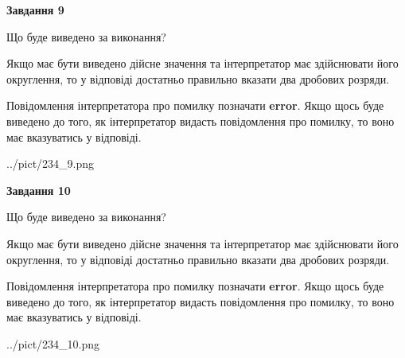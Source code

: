 \documentclass[12pt, ukrainian]{article}
\begin{document}
{\begin {Large}
{\begin {center}\textbf{Завдання 9}\end {center}}\par
Що буде виведено за виконання? \par

Якщо має бути виведено дійсне значення та інтерпретатор має здійснювати його округлення, 
то у відповіді достатньо правильно вказати два дробових розряди.

Повідомлення інтерпретатора про помилку позначати \textbf{error}.
Якщо щось буде виведено до того, як інтерпретатор видасть повідомлення про помилку, 
то воно має вказуватись у відповіді. \par

\begin{center}
	{../pict/234_9.png}
\end{center}
\newpage

{\begin {center}\textbf{Завдання 10}\end {center}}\par
Що буде виведено за виконання? \par

Якщо має бути виведено дійсне значення та інтерпретатор має здійснювати його округлення, 
то у відповіді достатньо правильно вказати два дробових розряди.

Повідомлення інтерпретатора про помилку позначати \textbf{error}.
Якщо щось буде виведено до того, як інтерпретатор видасть повідомлення про помилку, 
то воно має вказуватись у відповіді. \par

\begin{center}
	{../pict/234_10.png}
\end{center}
\newpage

\end {Large}}
\end{document}
